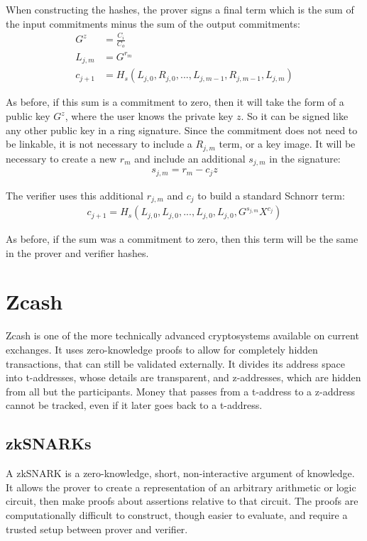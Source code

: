 \documentclass{article}
\begin{document}
When constructing the hashes, the prover signs a final term which is the sum of the input commitments minus the sum of the output commitments:
\begin{align}
  G^z &= \frac{C_i}{C_o}\\
  L_{j,m} &= G^{r_m}\\
  c_{j+1} &= H_s(L_{j,0}, R_{j,0}, ... , L_{j,m-1}, R_{j, m-1}, L_{j,m})
\end{align}

As before, if this sum is a commitment to zero, then it will take the form of a public key $G^z$, where the user knows the private key $z$.  So it can be signed like any other public key in a ring signature.  Since the commitment does not need to be linkable, it is not necessary to include a $R_{j,m}$ term, or a key image.  It will be necessary to create a new $r_m$ and include an additional $s_{j,m}$ in the signature:
\begin{align}
  s_{j,m} = r_m - c_j z
\end{align}

The verifier uses this additional $r_{j,m}$ and $c_j$ to build a standard Schnorr term:
\begin{align}
  c_{j+1} = H_s(L_{j,0}, L_{j,0}, ... , L_{j,0}, L_{j,0}, G^{s_{j,m}} X^{c_j})
\end{align}

As before, if the sum was a commitment to zero, then this term will be the same in the prover and verifier hashes.



\section{Zcash}

Zcash is one of the more technically advanced cryptosystems available on current exchanges.  It uses zero-knowledge proofs to allow for completely hidden transactions, that can still be validated externally.  It divides its address space into t-addresses, whose details are transparent, and z-addresses, which are hidden from all but the participants.  Money that passes from a t-address to a z-address cannot be tracked, even if it later goes back to a t-address.


\subsection{zkSNARKs}

A zkSNARK is a zero-knowledge, short, non-interactive argument of knowledge.  It allows the prover to create a representation of an arbitrary arithmetic or logic circuit, then make proofs about assertions relative to that circuit.  The proofs are computationally difficult to construct, though easier to evaluate, and require a trusted setup between prover and verifier.
\end{document}
